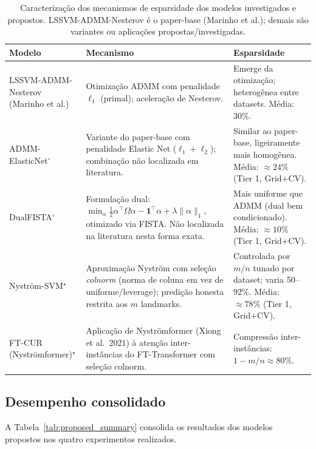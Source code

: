 \documentclass[12pt,a4paper]{article}
\begin{document}
\begin{table}[H]
\centering
\caption{Caracterização dos mecanismos de esparsidade dos modelos investigados
e propostos. LSSVM-ADMM-Nesterov é o paper-base (Marinho et al.); demais são
variantes ou aplicações propostas/investigadas.}
\label{tab:mechanisms}
\begin{tabular}{lp{4.5cm}p{4.5cm}}
\toprule
\textbf{Modelo} & \textbf{Mecanismo} & \textbf{Esparsidade} \\
\midrule
LSSVM-ADMM-Nesterov (Marinho et al.)
  & Otimização ADMM com penalidade $\ell_1$ (primal); aceleração de Nesterov.
  & Emerge da otimização; heterogênea entre datasets. Média: 30\%. \\
\addlinespace
ADMM-ElasticNet$^\circ$
  & Variante do paper-base com penalidade Elastic Net ($\ell_1+\ell_2$);
    combinação não localizada em literatura.
  & Similar ao paper-base, ligeiramente mais homogênea. Média: $\approx 24\%$ (Tier 1, Grid+CV). \\
\addlinespace
DualFISTA$^\circ$
  & Formulação dual:
    $\min_\alpha \frac{1}{2}\alpha^\top\Omega\alpha - \mathbf{1}^\top\alpha + \lambda\|\alpha\|_1$,
    otimizado via FISTA. Não localizada na literatura nesta forma exata.
  & Mais uniforme que ADMM (dual bem condicionado). Média: $\approx 10\%$ (Tier 1, Grid+CV). \\
\addlinespace
Nyström-SVM$^\star$
  & Aproximação Nyström com seleção \emph{colnorm} (norma de coluna em vez
    de uniforme/leverage); predição honesta restrita aos $m$ landmarks.
  & Controlada por $m/n$ tunado por dataset; varia 50--92\%. Média: $\approx 78\%$ (Tier 1, Grid+CV). \\
\addlinespace
FT-CUR (Nyströmformer)$^\star$
  & Aplicação de Nyströmformer (Xiong et al.\ 2021) à atenção inter-instâncias
    do FT-Transformer com seleção colnorm.
  & Compressão inter-instâncias: $1 - m/n \approx 80\%$. \\
\bottomrule
\end{tabular}
\end{table}

\subsection{Desempenho consolidado}

A Tabela~\ref{tab:proposed_summary} consolida os resultados dos modelos propostos
nos quatro experimentos realizados.
\end{document}
